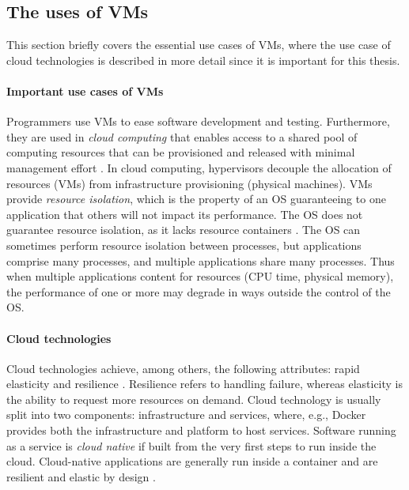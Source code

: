 \subsection{The uses of VMs}
This section briefly covers the essential use cases of VMs, where the use case of cloud technologies is described in more detail since it is important for this thesis.

\paragraph{Important use cases of VMs}
Programmers use VMs to ease software development and testing. Furthermore, they are used in \emph{cloud computing} that enables access to a shared pool of computing resources that can be provisioned and released with minimal management effort \cite{Mell2011}. In cloud computing, hypervisors decouple the allocation of resources (VMs) from infrastructure provisioning (physical machines). VMs provide \emph{resource isolation}, which is the property of an OS guaranteeing to one application that others will not impact its performance. The OS does not guarantee resource isolation, as it lacks resource containers \cite{Banga1999}. The OS can sometimes perform resource isolation between processes, but applications comprise many processes, and multiple applications share many processes. Thus when multiple applications content for resources (CPU time, physical memory), the performance of one or more may degrade in ways outside the control of the OS. 

\paragraph{Cloud technologies}
Cloud technologies achieve, among others, the following attributes: rapid elasticity and resilience \cite{Mell2011}. Resilience refers to handling failure, whereas elasticity is the ability to request more resources on demand. Cloud technology is usually split into two components: infrastructure and services, where, e.g., Docker provides both the infrastructure and platform to host services. Software running as a service is \emph{cloud native} if built from the very first steps to run inside the cloud. Cloud-native applications are generally run inside a container and are resilient and elastic by design \cite{Applis2019}\cite{TOFFETTI2017165}.


